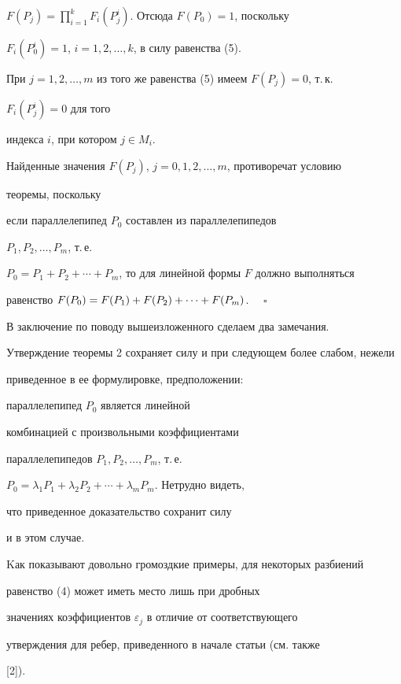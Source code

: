 $F(P_j)=\prod\limits^k_{i=1}F_i(P^i_j)$. Отсюда $F(P_0)=1$, поскольку 


$F_i(P^i_0)=1$, $i=1,2,\dotsc,k$, в силу равенства (5). 


При $j=1,2,\dotsc,m$ из того же равенства (5) имеем $F(P_j)=0$, т.\,к. 


$F_i(P^i_j)=0$ для того  


индекса $i$, при котором $j\in M_i$. 


 


Найденные значения $F(P_j)$, $j=0,1,2,\dotsc,m$, противоречат условию 


теоремы, поскольку  


если параллелепипед $P_0$ составлен из параллелепипедов 


$P_1,P_2,\dotsc,P_m$, т.\,е.  


$P_0=P_1+P_2+\dotsb+P_m$, то для линейной формы $F$ должно выполняться 


равенство $F(P_0)=F(P_1)+F(P_2)+\dotsb\linebreak +F(P_m)$. $\quad\square$


 


В заключение по поводу вышеизложенного сделаем два замечания.


 


\begin{note} 


Утверждение теоремы 2 сохраняет силу и при следующем более слабом, нежели 


приведенное в ее формулировке, предположении:  


параллелепипед $P_0$ является линейной  


комбинацией с произвольными коэффициентами  


параллелепипедов $P_1,P_2,\dotsc,P_m$, т.\,е.  


$P_0=\lambda_1P_1+\lambda_2P_2+\dotsb+\lambda_m P_m$. Нетрудно видеть, 


что приведенное доказательство сохранит силу  


и в этом случае.  


\end{note} 


 


\begin{note} 


Kак показывают довольно громоздкие примеры, для некоторых разбиений  


равенство (4) может иметь место лишь при дробных  


значениях коэффициентов $\varepsilon_j$ в отличие от соответствующего  


утверждения для ребер, приведенного в начале статьи (см. также  


[2]). 


\end{note} 


